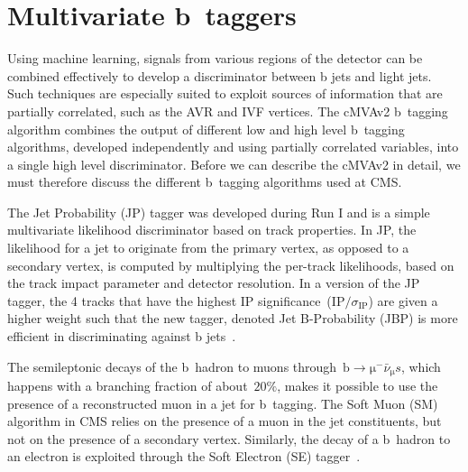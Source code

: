 \section{Multivariate b~taggers}
Using machine learning, signals from various regions of the detector can be combined effectively to develop a discriminator between b jets and light jets. Such techniques are especially suited to exploit sources of information that are partially correlated, such as the AVR and IVF vertices. The cMVAv2 b~tagging algorithm combines the output of different low and high level b~tagging algorithms, developed independently and using partially correlated variables, into a single high level discriminator. Before we can describe the cMVAv2 in detail, we must therefore discuss the different b~tagging algorithms used at CMS.

The Jet Probability (JP) tagger was developed during Run I and is a simple multivariate likelihood discriminator based on track properties. In JP, the likelihood for a jet to originate from the primary vertex, as opposed to a secondary vertex, is computed by multiplying the per-track likelihoods, based on the track impact parameter and detector resolution. In a version of the JP tagger, the 4 tracks that have the highest IP significance~($\mathrm{IP} / \sigma_{\mathrm{IP}}$) are given a higher weight such that the new tagger, denoted Jet B-Probability (JBP) is more efficient in discriminating against b jets~\cite{Chatrchyan:2012jua}.

The semileptonic decays of the b~hadron to muons through~$\mathrm{b} \rightarrow \mathrm{\mu}^- \bar{\nu}_{\mathrm{\mu}} s$, which happens with a branching fraction of about~$20\%$, makes it possible to use the presence of a reconstructed muon in a jet for b~tagging. The Soft Muon (SM) algorithm in CMS relies on the presence of a muon in the jet constituents, but not on the presence of a secondary vertex. Similarly, the decay of a b~hadron to an electron is exploited through the Soft Electron (SE) tagger~\cite{CMS-PAS-BTV-15-001}. 

